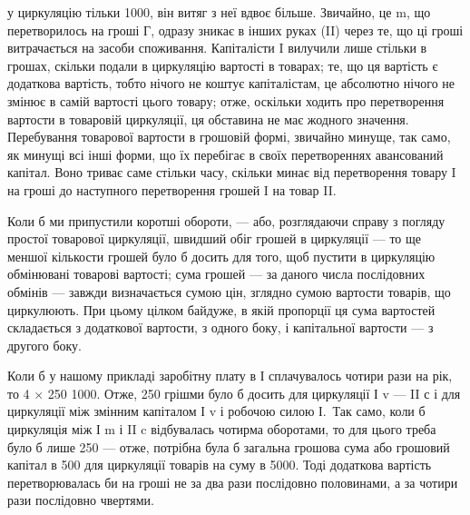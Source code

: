 \parcont{}  %
у циркуляцію тільки 1000, він витяг з неї вдвоє більше. Звичайно,
це m, що перетворилось на гроші Г, одразу зникає в інших руках
(II) через те, що ці гроші витрачається на засоби споживання. Капіталісти I
вилучили лише стільки в грошах, скільки подали в циркуляцію вартості
в товарах; те, що ця вартість є додаткова вартість, тобто нічого не коштує
капіталістам, це абсолютно нічого не змінює в самій вартості цього товару;
отже, оскільки ходить про перетворення вартости в товаровій циркуляції,
ця обставина не має жодного значення. Перебування товарової вартости
в грошовій формі, звичайно минуще, так само, як минущі всі інші форми,
що їх перебігає в своїх перетвореннях авансований капітал. Воно триває
саме стільки часу, скільки минає від перетворення товару I на гроші до
наступного перетворення грошей I на товар II.

Коли б ми припустили коротші обороти, — або, розглядаючи справу
з погляду простої товарової циркуляції, швидший обіг грошей в циркуляції
— то ще меншої кількости грошей було б досить для того, щоб
пустити в циркуляцію обмінювані товарові вартості; сума грошей — за
даного числа послідовних обмінів — завжди визначається сумою цін, зглядно
сумою вартости товарів, що циркулюють. При цьому цілком байдуже,
в якій пропорції ця сума вартостей складається з додаткової вартости,
з одного боку, і капітальної вартости — з другого боку.

Коли б у нашому прикладі заробітну плату в І сплачувалось чотири
рази на рік, то 4 × 250 \deq{} 1000. Отже, 250 грішми було б
досить для циркуляції І v —  II с і для циркуляції між змінним капіталом
І v і робочою силою І.~Так само, коли б циркуляція між І m і
II c відбувалась чотирма оборотами, то для цього треба було б лише
250 — отже, потрібна була б загальна грошова сума або грошовий
капітал в 500 для циркуляції товарів на суму в 5000.
Тоді додаткова вартість перетворювалась би на гроші не за два рази
послідовно половинами, а за чотири рази послідовно чвертями.

